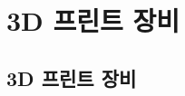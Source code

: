 \documentclass[12pt, a4paper, oneside]{book}
\begin{document}
	\part{3D 프린트 장비}
	\noptcrule
	\parttoc				


%
	\chapter{3D 프린트 장비}












\end{document}
